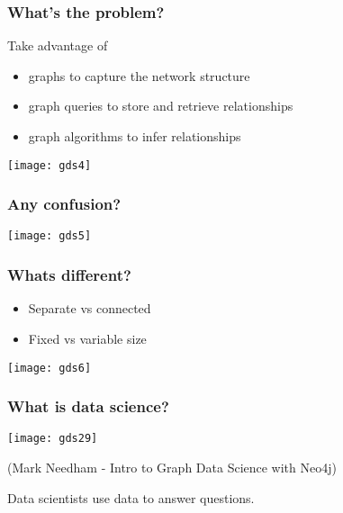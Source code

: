 \begin{frame}[fragile]\frametitle{What's the problem?}

Take advantage of 

\begin{itemize}
\item graphs to capture the network structure
\item graph queries to store and retrieve relationships
\item graph algorithms to infer relationships 
\end{itemize}

\begin{center}
\texttt{[image: gds4]}
\end{center}

\end{frame}

\begin{frame}[fragile]\frametitle{Any confusion?}

\begin{center}
\texttt{[image: gds5]}
\end{center}

\end{frame}

\begin{frame}[fragile]\frametitle{Whats different?}

\begin{itemize}
\item Separate vs connected
\item Fixed vs variable size
\end{itemize}

\begin{center}
\texttt{[image: gds6]}
\end{center}

\end{frame}

\begin{frame}[fragile]\frametitle{What is data science?}

\begin{center}
\texttt{[image: gds29]}

{\tiny (Mark Needham - Intro to Graph Data Science with Neo4j)}

\end{center}

Data scientists use data to answer questions.

\end{frame}

